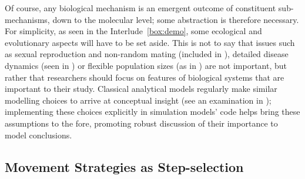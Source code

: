 Of course, any biological mechanism is an emergent outcome of constituent sub-mechanisms, down to the molecular level; some abstraction is therefore necessary.
For simplicity, as seen in the Interlude~\ref{box:demo}, some ecological and evolutionary aspects will have to be set aside.
This is not to say that issues such as sexual reproduction and non-random mating (included in \cite{getz2016}), detailed disease dynamics (seen in \cite{white2018,scherer2020}) or flexible population sizes (as in \cite{netz2021}) are not important, but rather that researchers should focus on features of biological systems that are important to their study.
Classical analytical models regularly make similar modelling choices to arrive at conceptual insight (see an examination in \cite{vandermeer1997}); implementing these choices explicitly in simulation models' code helps bring these assumptions to the fore, promoting robust discussion of their importance to model conclusions.

\subsection*{Movement Strategies as Step-selection}


